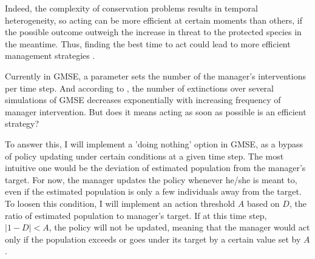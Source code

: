\documentclass[12pt,a4paper]{article}
\begin{document}
Indeed, the complexity of conservation problems results in temporal heterogeneity, so acting can be more efficient at certain moments than others, if the possible outcome outweigh the increase in threat to the protected species in the meantime.
Thus, finding the best time to act could lead to more efficient management strategies \citep{Iacona2017waiting}.
%

Currently in GMSE, a parameter sets the number of the manager's interventions per time step.
And according to \cite{duthie2018}, the number of extinctions over several simulations of GMSE decreases exponentially with increasing frequency of manager intervention.
But does it means acting as soon as possible is an efficient strategy?

To answer this, I will implement a 'doing nothing' option in GMSE, as a bypass of policy updating under certain conditions at a given time step.
The most intuitive one would be the deviation of estimated population from the manager's target.
For now, the manager updates the policy whenever he/she is meant to, even if the estimated population is only a few individuals away from the target.
To loosen this condition, I will implement an action threshold $A$ based on $D$, the ratio of estimated population to manager's target.
If at this time step, $|1 - D| < A$, the policy will not be updated, meaning that the manager would act only if the population exceeds or goes under its target by a certain value set by $A$.
\end{document}
